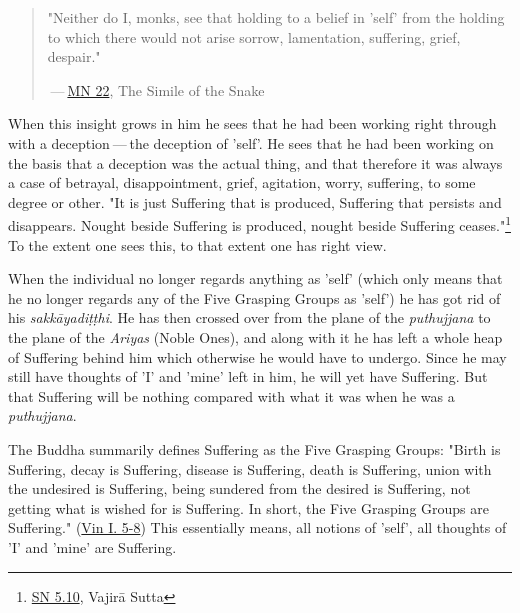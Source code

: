 \begin{quotation}
"Neither do I, monks, see that holding to a belief in 'self' from the
holding to which there would not arise sorrow, lamentation, suffering,
grief, despair."


 — \href{https://suttacentral.net/mn22/en/bodhi}{MN 22}, The Simile of the Snake


\end{quotation}

When this insight grows in him he sees that he had been working right
through with a deception — the deception of 'self'. He sees that he had
been working on the basis that a deception was the actual thing, and
that therefore it was always a case of betrayal, disappointment, grief,
agitation, worry, suffering, to some degree or other. "It is just
Suffering that is produced, Suffering that persists and disappears.
Nought beside Suffering is produced, nought beside Suffering
ceases."\footnote{\href{https://suttacentral.net/sn5.10/en/bodhi}{SN 5.10}, Vajirā Sutta}
To the extent one sees this, to that extent one has right view.


When the individual no longer regards anything as 'self' (which only
means that he no longer regards any of the Five Grasping Groups as
'self') he has got rid of his \emph{sakkāyadiṭṭhi}. He has then crossed
over from the plane of the \emph{puthujjana} to the plane of the \emph{Ariyas}
(Noble Ones), and along with it he has left a whole heap of Suffering
behind him which otherwise he would have to undergo. Since he may still
have thoughts of 'I' and 'mine' left in him, he will yet have Suffering.
But that Suffering will be nothing compared with what it was when he was
a \emph{puthujjana}.


The Buddha summarily defines Suffering as the Five Grasping Groups:
"Birth is Suffering, decay is Suffering, disease is Suffering, death is
Suffering, union with the undesired is Suffering, being sundered from
the desired is Suffering, not getting what is wished for is Suffering.
In short, the Five Grasping Groups are Suffering." (\href{https://suttacentral.net/pli-tv-kd1/en/brahmali}{Vin I. 5-8})
This essentially means, all notions of 'self', all thoughts of 'I' and
'mine' are Suffering.


